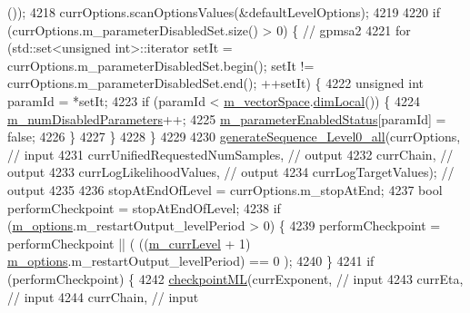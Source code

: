 \begin{DoxyCode}
{      ());
4218     currOptions.scanOptionsValues(&defaultLevelOptions);
4219 
4220     \textcolor{keywordflow}{if} (currOptions.m\_parameterDisabledSet.size() > 0) \{ \textcolor{comment}{// gpmsa2}
4221       \textcolor{keywordflow}{for} (std::set<unsigned int>::iterator setIt = currOptions.m\_parameterDisabledSet.begin(); setIt != 
      currOptions.m\_parameterDisabledSet.end(); ++setIt) \{
4222         \textcolor{keywordtype}{unsigned} \textcolor{keywordtype}{int} paramId = *setIt;
4223         \textcolor{keywordflow}{if} (paramId < \hyperlink{class_q_u_e_s_o_1_1_m_l_sampling_a7bc4c72f65ba9166ed94a6e198b0915b}{m\_vectorSpace}.\hyperlink{class_q_u_e_s_o_1_1_vector_space_a5829a1f4f996f8307c840b705144d666}{dimLocal}()) \{
4224           \hyperlink{class_q_u_e_s_o_1_1_m_l_sampling_afbe27e6149562020663b72da6592d933}{m\_numDisabledParameters}++;
4225           \hyperlink{class_q_u_e_s_o_1_1_m_l_sampling_ac76690384f70d74b8662faf7a051449e}{m\_parameterEnabledStatus}[paramId] = \textcolor{keyword}{false};
4226         \}
4227       \}
4228     \}
4229 
4230     \hyperlink{class_q_u_e_s_o_1_1_m_l_sampling_a0a2615d8f3627630d0cb62cb91614bd1}{generateSequence\_Level0\_all}(currOptions,                    \textcolor{comment}{// input}
4231                                 currUnifiedRequestedNumSamples, \textcolor{comment}{// output}
4232                                 currChain,                      \textcolor{comment}{// output}
4233                                 currLogLikelihoodValues,        \textcolor{comment}{// output}
4234                                 currLogTargetValues);           \textcolor{comment}{// output}
4235 
4236     stopAtEndOfLevel = currOptions.m\_stopAtEnd;
4237     \textcolor{keywordtype}{bool} performCheckpoint = stopAtEndOfLevel;
4238     \textcolor{keywordflow}{if} (\hyperlink{class_q_u_e_s_o_1_1_m_l_sampling_af8504cc57ec72b3c52833826b2bfff8e}{m\_options}.m\_restartOutput\_levelPeriod > 0) \{
4239       performCheckpoint = performCheckpoint || ( ((\hyperlink{class_q_u_e_s_o_1_1_m_l_sampling_af9416874c856e50f3b35270e801f17e4}{m\_currLevel} + 1) %
      \hyperlink{class_q_u_e_s_o_1_1_m_l_sampling_af8504cc57ec72b3c52833826b2bfff8e}{m\_options}.m\_restartOutput\_levelPeriod) == 0 );
4240     \}
4241     \textcolor{keywordflow}{if} (performCheckpoint) \{
4242       \hyperlink{class_q_u_e_s_o_1_1_m_l_sampling_aa8e7bb1bd54ccafb9b276127a76eba71}{checkpointML}(currExponent,            \textcolor{comment}{// input}
4243                    currEta,                 \textcolor{comment}{// input}
4244                    currChain,               \textcolor{comment}{// input}
}
\end{DoxyCode}
